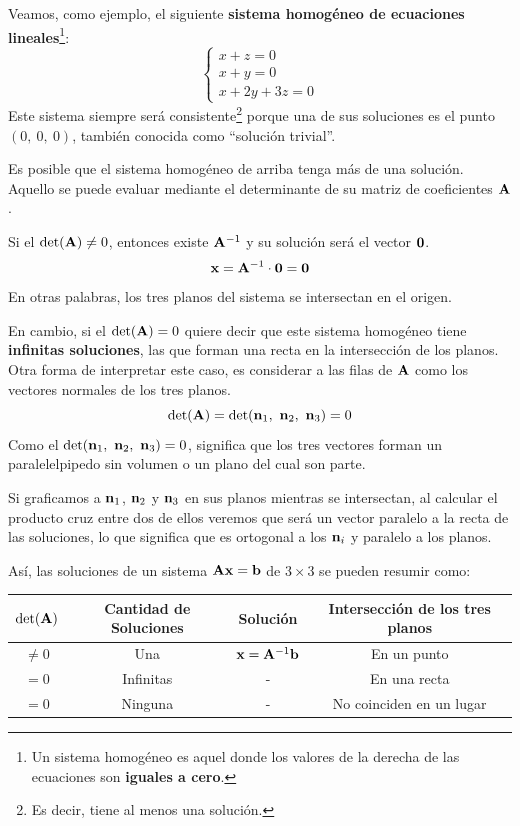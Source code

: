 \documentclass[12pt]{article}
\begin{document}
Veamos, como ejemplo, el siguiente \textbf{sistema homogéneo de ecuaciones lineales}\footnote{Un sistema homogéneo es aquel donde los valores de la derecha de las ecuaciones son \textbf{iguales a cero}.}:
\[
\left\{
\begin{aligned}
x + z = 0 \\
x + y = 0 \\
x + 2y + 3z = 0
\end{aligned}
\right.
\]
Este sistema siempre será consistente\footnote{Es decir, tiene al menos una solución.} porque una de sus soluciones es el punto $(0, \ 0, \ 0)$, también conocida como ``solución trivial''.

Es posible que el sistema homogéneo de arriba tenga más de una solución. Aquello se puede evaluar mediante el determinante de su matriz de coeficientes $\mathbf{A}$.

Si el $\det(\mathbf{A}) \neq 0$, entonces existe $\mathbf{A}^{-1}$ y su solución será el vector $\mathbf{0}$.
\[
  \mathbf{x} = \mathbf{A}^{-1} \cdot \mathbf{0} = \mathbf{0}
\]
En otras palabras, los tres planos del sistema se intersectan en el origen.

En cambio, si el $\det(\mathbf{A}) = 0$ quiere decir que este sistema homogéneo tiene \textbf{infinitas soluciones}, las que forman una recta en la intersección de los planos. Otra forma de interpretar este caso, es considerar a las filas de $\mathbf{A}$ como los vectores normales de los tres planos.
\[
  \det(\vecmat{A}) = \det(\vecmat{n}_{1}, \ \vecmat{n}_{2}, \ \vecmat{n}_{3}) = 0
\]
Como el $\det(\vecmat{n}_{1}, \ \vecmat{n}_{2}, \ \vecmat{n}_{3}) = 0$, significa que los tres vectores forman un paralelelpipedo sin volumen o un plano del cual son parte.

Si graficamos a $\mathbf{n}_{1}$, $\mathbf{n}_{2}$ y $\mathbf{n}_{3}$ en sus planos mientras se intersectan, al calcular el producto cruz entre dos de ellos veremos que será un vector paralelo a la recta de las soluciones, lo que significa que es ortogonal a los $\mathbf{n}_{i}$ y paralelo a los planos.

Así, las soluciones de un sistema $\mathbf{A}\mathbf{x} = \mathbf{b}$ de $3 \times 3$ se pueden resumir como:

\begin{table}[hbt!]
\centering

\renewcommand{\arraystretch}{1.3}
\begin{tabular}{c c c c}
\hline
$\det(\mathbf{A})$ & Cantidad de Soluciones & Solución & Intersección de los tres planos \\
\hline
$\neq 0$ & Una & $\mathbf{x} = \mathbf{A}^{-1} \mathbf{b}$ & En un punto \\
$= 0$ & Infinitas & - & En una recta \\
$= 0$ & Ninguna & - & No coinciden en un lugar \\
\hline
\end{tabular}

\end{table}
\end{document}
